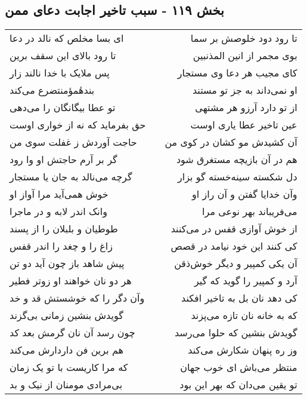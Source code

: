 \begin{center}
\section*{بخش ۱۱۹ - سبب تاخیر اجابت دعای ممن}
\label{sec:sh119}
\begin{longtable}{l p{0.5cm} r}
ای بسا مخلص که نالد در دعا
&&
تا رود دود خلوصش بر سما
\\
تا رود بالای این سقف برین
&&
بوی مجمر از انین المذنبین
\\
پس ملایک با خدا نالند زار
&&
کای مجیب هر دعا وی مستجار
\\
بندهٔمؤمنتضرع می‌کند
&&
او نمی‌داند به جز تو مستند
\\
تو عطا بیگانگان را می‌دهی
&&
از تو دارد آرزو هر مشتهی
\\
حق بفرماید که نه از خواری اوست
&&
عین تاخیر عطا یاری اوست
\\
حاجت آوردش ز غفلت سوی من
&&
آن کشیدش مو کشان در کوی من
\\
گر بر آرم حاجتش او وا رود
&&
هم در آن بازیچه مستغرق شود
\\
گرچه می‌نالد به جان یا مستجار
&&
دل شکسته سینه‌خسته گو بزار
\\
خوش همی‌آید مرا آواز او
&&
وآن خدایا گفتن و آن راز او
\\
وانک اندر لابه و در ماجرا
&&
می‌فریباند بهر نوعی مرا
\\
طوطیان و بلبلان را از پسند
&&
از خوش آوازی قفس در می‌کنند
\\
زاغ را و چغد را اندر قفس
&&
کی کنند این خود نیامد در قصص
\\
پیش شاهد باز چون آید دو تن
&&
آن یکی کمپیر و دیگر خوش‌ذقن
\\
هر دو نان خواهند او زوتر فطیر
&&
آرد و کمپیر را گوید که گیر
\\
وآن دگر را که خوشستش قد و خد
&&
کی دهد نان بل به تاخیر افکند
\\
گویدش بنشین زمانی بی‌گزند
&&
که به خانه نان تازه می‌پزند
\\
چون رسد آن نان گرمش بعد کد
&&
گویدش بنشین که حلوا می‌رسد
\\
هم برین فن داردارش می‌کند
&&
وز ره پنهان شکارش می‌کند
\\
که مرا کاریست با تو یک زمان
&&
منتظر می‌باش ای خوب جهان
\\
بی‌مرادی مومنان از نیک و بد
&&
تو یقین می‌دان که بهر این بود
\\
\end{longtable}
\end{center}
